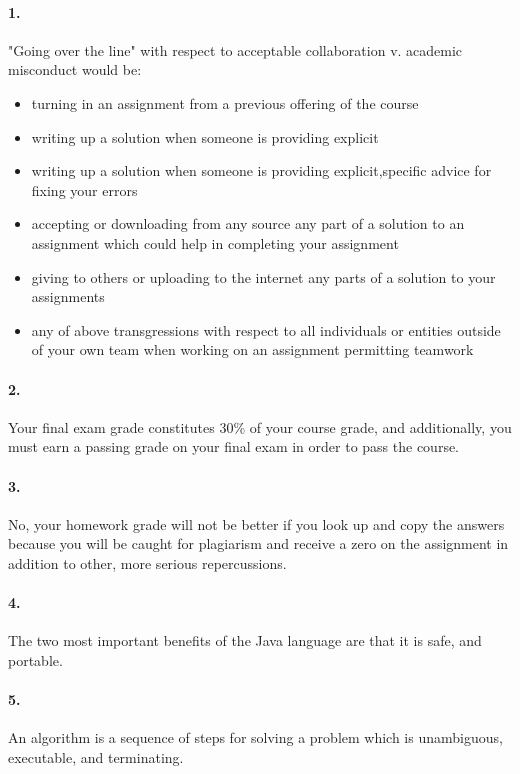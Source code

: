 \documentclass[10pt]{article}
\begin{document}
\maketitle


\paragraph{1. }
"Going over the line" with respect to acceptable collaboration v. academic misconduct would be: 
\begin{itemize}
 \item turning in an assignment from a previous offering of the course
 \item writing up a solution when someone is providing explicit
 \item writing up a solution when someone is providing explicit,specific advice for fixing your errors
 \item accepting or downloading from any source any part of a solution to an assignment which could help in completing your assignment
 \item giving to others or uploading to the internet any parts of a solution to your assignments
  \item any of above transgressions with respect to all individuals or entities outside of your own team when working on an assignment permitting teamwork
 \end{itemize} 
 
\paragraph{2. }
Your final exam grade constitutes 30\% of your course grade, and additionally, you must earn a passing grade on your final exam in order to pass the course. 

\paragraph{3. }
No, your homework grade will not be better if you look up and copy the answers because you will be caught for plagiarism and receive a zero on the assignment in addition to other, more serious repercussions. 
\paragraph{4. }
The two most important benefits of the Java language are that it is safe, and portable. 
\paragraph{5. }
An algorithm is a sequence of steps for solving a problem which is unambiguous, executable, and terminating. 
\end{document}
